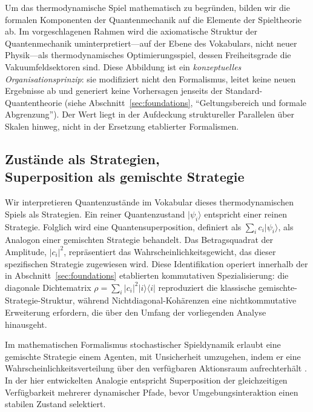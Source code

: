 \documentclass[12pt,a4paper]{article}
\theoremstyle{remark}
\begin{document}
Um das thermodynamische Spiel mathematisch zu begr\"unden, bilden wir die formalen Komponenten der Quantenmechanik auf die Elemente der Spieltheorie ab. Im vorgeschlagenen Rahmen wird die axiomatische Struktur der Quantenmechanik uminterpretiert---auf der Ebene des Vokabulars, nicht neuer Physik---als thermodynamisches Optimierungsspiel, dessen Freiheitsgrade die Vakuumfeldsektoren sind. Diese Abbildung ist ein \emph{konzeptuelles Organisationsprinzip}: sie modifiziert nicht den Formalismus, leitet keine neuen Ergebnisse ab und generiert keine Vorhersagen jenseits der Standard-Quantentheorie (siehe Abschnitt~\ref{sec:foundations}, ``Geltungsbereich und formale Abgrenzung''). Der Wert liegt in der Aufdeckung struktureller Parallelen \"uber Skalen hinweg, nicht in der Ersetzung etablierter Formalismen.

\subsection[Zust\"ande als Strategien, Superposition als gemischte Strategie]{Zust\"ande als Strategien,\\Superposition als gemischte Strategie}

Wir interpretieren Quantenzust\"ande im Vokabular dieses thermodynamischen Spiels als Strategien. Ein reiner Quantenzustand $|\psi_i\rangle$ entspricht einer reinen Strategie. Folglich wird eine Quantensuperposition, definiert als $\sum_i c_i |\psi_i\rangle$, als Analogon einer gemischten Strategie behandelt. Das Betragsquadrat der Amplitude, $|c_i|^2$, repr\"asentiert das Wahrscheinlichkeitsgewicht, das dieser spezifischen Strategie zugewiesen wird. Diese Identifikation operiert innerhalb der in Abschnitt~\ref{sec:foundations} etablierten kommutativen Spezialisierung: die diagonale Dichtematrix $\rho = \sum_i |c_i|^2 |i\rangle\langle i|$ reproduziert die klassische gemischte-Strategie-Struktur, w\"ahrend Nichtdiagonal-Koh\"arenzen eine nichtkommutative Erweiterung erfordern, die \"uber den Umfang der vorliegenden Analyse hinausgeht.

Im mathematischen Formalismus stochastischer Spieldynamik erlaubt eine gemischte Strategie einem Agenten, mit Unsicherheit umzugehen, indem er eine Wahrscheinlichkeitsverteilung \"uber den verf\"ugbaren Aktionsraum aufrechterh\"alt \citep{BusemeyerBruza2012}. In der hier entwickelten Analogie entspricht Superposition der gleichzeitigen Verf\"ugbarkeit mehrerer dynamischer Pfade, bevor Umgebungsinteraktion einen stabilen Zustand selektiert.
\end{document}
